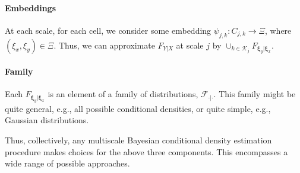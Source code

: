 \documentclass{article} %
\providecommand{\mh}[1]{\hat{#1}}
\providecommand{\mb}[1]{\boldsymbol{#1}}
\providecommand{\mc}[1]{\mathcal{#1}}
\newcommand{\from}{{\ensuremath{\colon}}}  %
\newcommand{\ZZ}{\mathbb{Z}}
\begin{document}
\paragraph{Embeddings}
At each scale, for each cell, we consider some embedding $\psi_{j,k} \from C_{j,k} \to \Xi$, where $(\xi_x,\xi_y) \in \Xi$.  Thus, we can approximate $F_{Y|X}$ at scale $j$ by $\cup_{k \in \mc{K}_j} F_{\mb{\xi}_y| \mb{\xi}_x}$.   

\paragraph{Family} Each $F_{\mb{\xi}_y | \mb{\xi}_x}$ is an element of a family of distributions, $\mc{F}_{\cdot | \cdot}$.  This family might be quite general, e.g., all possible conditional densities, or quite simple, e.g., Gaussian distributions.


Thus, collectively, any multiscale Bayesian conditional density estimation procedure makes choices for the above three components.  This encompasses a wide range of possible approaches. 

\end{document}
